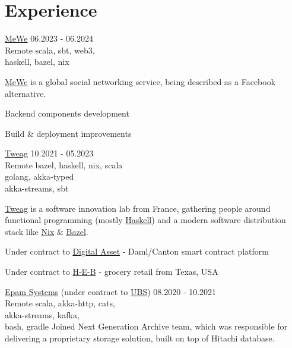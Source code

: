 \section{Experience}
      {\href{https://www.mewe.com}{MeWe}}
      {06.2023 - 06.2024\\Remote}
      {scala, sbt, web3,\\haskell, bazel, nix}
      { \href{mewe.com}{MeWe} is a global social networking service, being described as a Facebook
        alternative.
        \begin{missions}
          \item Backend components development
          \item Build \& deployment improvements
        \end{missions}
      }
      {\href{https://www.tweag.io}{Tweag}}
      {10.2021 - 05.2023\\Remote}
      {bazel, haskell, nix, scala\\golang, akka-typed\\akka-streams, sbt}
      { \href{tweag.io}{Tweag} is a software innovation lab from France, gathering people around
        functional programming (mostly \href{https://www.haskell.org}{Haskell}) and a modern
        software distribution stack like \href{https://nixos.org}{Nix} \& \href{https://bazel.build}{Bazel}.
        \begin{missions}
        \item Under contract to \href{https://www.digitalasset.com}{Digital Asset} -
          Daml/Canton smart contract platform
        \item Under contract to \href{https://www.heb.com}{H-E-B} -
          grocery retail from Texas, USA
        \end{missions}
      }
      {\href{https://www.epam.com}{Epam Systems} (under contract to \href{https://www.ubs.com}{UBS})}
      {08.2020 - 10.2021\\Remote}
      {scala, akka-http, cats,\\akka-streams, kafka,\\bash, gradle}
      {Joined Next Generation Archive team, which was responsible for delivering a proprietary storage solution,
        built on top of Hitachi database.
      }
